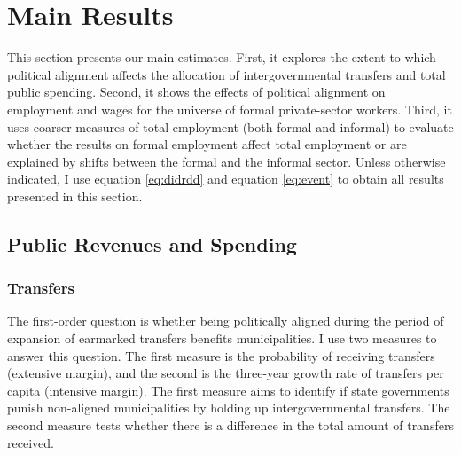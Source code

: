 \documentclass[dv_diss_main.tex]{subfiles}
\begin{document}
\section{Main Results}\label{MainResults}

This section presents our main estimates. First, it explores the extent to which political alignment affects the allocation of intergovernmental transfers and total public spending. Second, it shows the effects of political alignment on employment and wages for the universe of formal private-sector workers. Third, it uses coarser measures of total employment (both formal and informal) to evaluate whether the results on formal employment affect total employment or are explained by shifts between the formal and the informal sector. Unless otherwise indicated, I use equation \eqref{eq:didrdd} and equation \eqref{eq:event} to obtain all results presented in this section.

\subsection{Public Revenues and Spending}

\subsubsection{Transfers} 
The first-order question is whether being politically aligned during the period of expansion of earmarked transfers benefits municipalities. I use two measures to answer this question. The first measure is the probability of receiving transfers (extensive margin), and the second is the three-year growth rate of transfers per capita (intensive margin). The first measure aims to identify if state governments punish non-aligned municipalities by holding up intergovernmental transfers. The second measure tests whether there is a difference in the total amount of transfers received.
\end{document}
